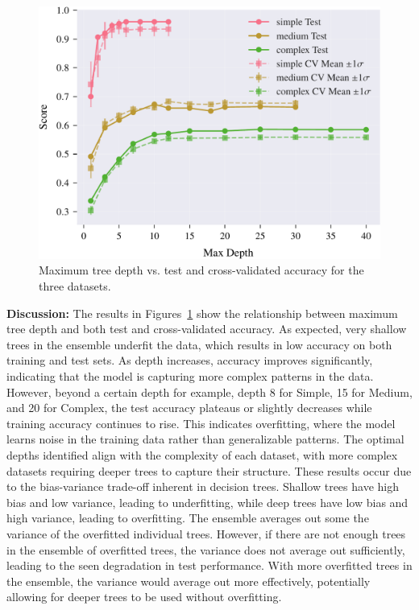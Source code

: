 \documentclass[conference]{IEEEtran}
\begin{document}
\begin{figure}[H]
  \centering
  \includegraphics[width=\linewidth]{images/all_datasets_depth_accuracy.pdf}
  \caption{Maximum tree depth vs. test and cross-validated accuracy for the three datasets.}
  \label{fig:exp1-depth-acc}
\end{figure}

\textbf{Discussion:}
 The results in Figures~\ref{fig:exp1-depth-acc} show the relationship between maximum tree depth and both test and cross-validated accuracy. As expected, very shallow trees in the ensemble underfit the data, which results in low accuracy on both training and test sets. As depth increases, accuracy improves significantly, indicating that the model is capturing more complex patterns in the data. However, beyond a certain depth for example,  depth 8 for Simple, 15 for Medium, and 20 for Complex, the test accuracy plateaus or slightly decreases while training accuracy continues to rise. This indicates overfitting, where the model learns noise in the training data rather than generalizable patterns. The optimal depths identified align with the complexity of each dataset, with more complex datasets requiring deeper trees to capture their structure. These results occur due to the bias-variance trade-off inherent in decision trees. Shallow trees have high bias and low variance, leading to underfitting, while deep trees have low bias and high variance, leading to overfitting. The ensemble averages out some the variance of the overfitted individual trees. However, if there are not enough trees in the ensemble of overfitted trees, the variance does not average out sufficiently, leading to the seen degradation in test performance. With more overfitted trees in the ensemble, the variance would average out more effectively, potentially allowing for deeper trees to be used without overfitting.
\end{document}
